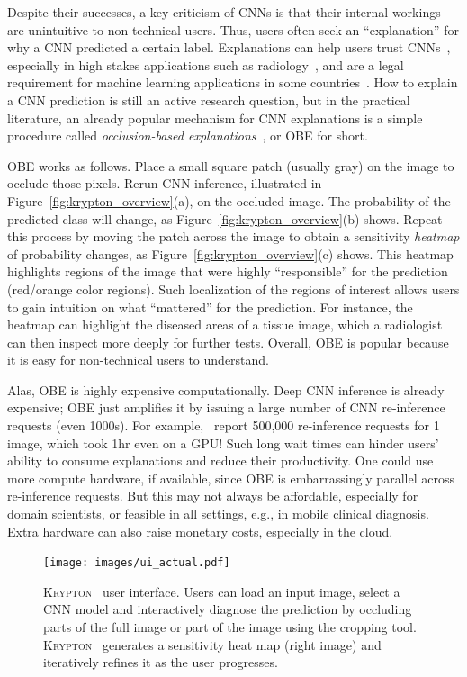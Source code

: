 \documentclass{vldb}
\newcommand{\system}{\textsc{Krypton}}
\begin{document}
Despite their successes, a key criticism of CNNs is that their internal workings are unintuitive to non-technical users. Thus, users often seek an ``explanation'' for why a CNN predicted a certain label. Explanations can help users trust CNNs~\cite{ribeiro2016should}, especially in high stakes applications such as radiology~\cite{jung2017deep}, and are a legal requirement for machine learning applications in some countries~\cite{gdpr}. How to explain a CNN prediction is still an active research question, but in the practical literature, an already popular mechanism for CNN explanations is a simple procedure called \textit{occlusion-based explanations}~\cite{zeiler2014visualizing}, or OBE for short.

OBE works as follows. Place a small square patch (usually gray) on the image to occlude those pixels. Rerun CNN inference, illustrated in Figure~\ref{fig:krypton_overview}(a), on the occluded image. The probability of the predicted class will change, as Figure~\ref{fig:krypton_overview}(b) shows. Repeat this process by moving the patch across the image to obtain a sensitivity \textit{heatmap} of probability changes, as Figure~\ref{fig:krypton_overview}(c) shows. This heatmap highlights regions of the image that were highly ``responsible'' for the prediction (red/orange color regions). Such localization of the regions of interest allows users to gain intuition on what ``mattered'' for the prediction. For instance, the heatmap can highlight the diseased areas of a tissue image, which a radiologist can then inspect more deeply for further tests. 
Overall, OBE is popular because it is easy for non-technical users to understand.

Alas, OBE is highly expensive computationally. Deep CNN inference is already expensive; OBE just amplifies it by issuing a large number of CNN re-inference requests (even 1000s). For example,~\cite{zintgraf2017visualizing} report 500,000 re-inference requests for 1 image, which took 1hr even on a GPU! Such long wait times can hinder users' ability to consume explanations and reduce their productivity. One could use more compute hardware, if available, since OBE is embarrassingly parallel across re-inference requests. But this may not always be affordable, especially for domain scientists, or feasible in all settings, e.g., in mobile clinical diagnosis. Extra hardware can also raise monetary costs, especially in the cloud.


\begin{figure}[t]\label{img:ui}
\texttt{[image: images/ui\_actual.pdf]}
\caption{\system~ user interface. Users can load an input image, select a CNN model and interactively diagnose the prediction by occluding parts of the full image or part of the image using the cropping tool. \system~ generates a sensitivity heat map (right image) and iteratively refines it as the user progresses.}
\end{figure}
\end{document}
